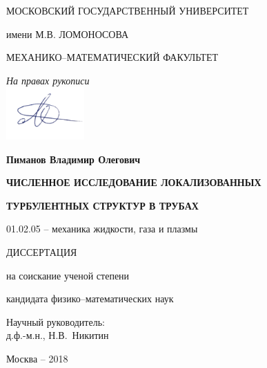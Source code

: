 \begin{titlepage}
\newpage
\pagestyle{plain} \thispagestyle{empty}

\centerline{МОСКОВСКИЙ ГОСУДАРСТВЕННЫЙ УНИВЕРСИТЕТ}
\centerline{имени М.В. ЛОМОНОСОВА}
\par
\centerline{МЕХАНИКО--МАТЕМАТИЧЕСКИЙ ФАКУЛЬТЕТ}
\par
\vspace*{1cm}
\begin{flushright}
{\it На правах рукописи}\\
\vspace*{0.5cm}
\includegraphics[height=2cm]{sign/sign.png}\ \ \ \ \ \ \ \ 
\end{flushright}

\par
\vspace*{0.5cm} \centerline{\bf Пиманов Владимир Олегович}
\vspace*{1cm} \centerline {\bf ЧИСЛЕННОЕ ИССЛЕДОВАНИЕ ЛОКАЛИЗОВАННЫХ}
 \centerline  {\bf ТУРБУЛЕНТНЫХ СТРУКТУР В ТРУБАХ}

\vspace*{1cm} \centerline{01.02.05 -- механика жидкости, газа и плазмы}

\vspace*{1cm} 
\centerline{ДИССЕРТАЦИЯ}
\centerline{на соискание ученой степени}
\centerline{кандидата физико--математических наук}

\vspace{30mm} \hfill\parbox[t]{80mm}{
Научный руководитель: \\
д.ф.-м.н., Н.В.~Никитин}

\par
\vspace*{4cm} \centerline{Москва -- 2018}

\end{titlepage}
